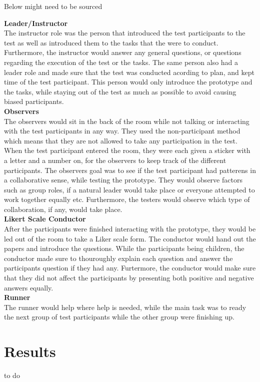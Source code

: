 Below might need to be sourced

\textbf{Leader/Instructor} \\
The instructor role was the person that introduced the test participants to the test as well as introduced them to the tasks that the were to conduct. Furthermore, the instructor would answer any general questions, or questions regarding the execution of the test or the tasks. The same person also had a leader role and made sure that the test was conducted acording to plan, and kept time of the test participant. This person would only introduce the prototype and the tasks, while staying out of the test as much as possible to avoid causing biased participants.
\\
\textbf{Observers} \\
The observers would sit in the back of the room while not talking or interacting with the test participants in any way. They used the non-participant method which means that they are not allowed to take any participation in the test. When the test participant entered the room, they were each given a sticker with a letter and a number on, for the observers to keep track of the different participants. The observers goal was to see if the test participant had patterens in a collaborative sense, while testing the prototype. They would observe factors such as group roles, if a natural leader would take place or everyone attempted to work together equally etc. Furthermore, the testers would observe which type of collaboration, if any, would take place. 
\\
\textbf{Likert Scale Conductor} \\
After the participants were finished interacting with the prototype, they would be led out of the room to take a Liker scale form. The conductor would hand out the papers and introduce the questions. While the participants being children, the conductor made sure to thouroughly explain each question and answer the participants question if they had any. Furtermore, the conductor would make sure that they did not affect the participants by presenting both positive and negative answers equally.
\\
\textbf{Runner} \\
The runner would help where help is needed, while the main task was to ready the next group of test participants while the other group were finishing up.
\\


\section{Results}
to do


